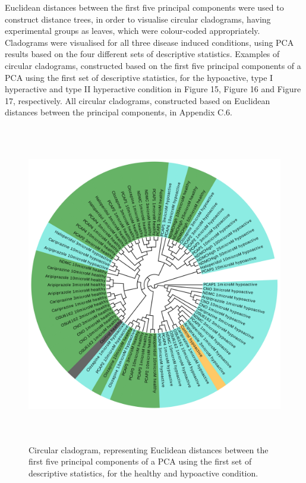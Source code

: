 \documentclass[a4paper,12pt]{article}
\begin{document}
\newpage
Euclidean distances between the first five principal components were used to construct distance trees, in order to visualise circular cladograms, having experimental groups as leaves, which were colour-coded appropriately. Cladograms were visualised for all three disease induced conditions, using PCA results based on the four different sets of descriptive statistics. Examples of circular cladograms, constructed based on the first five principal components of a PCA using the first set of descriptive statistics, for the hypoactive, type I hyperactive and type II hyperactive condition in Figure 15, Figure 16 and Figure 17, respectively. All circular cladograms, constructed based on Euclidean distances between the principal components, in Appendix C.6. 
\begin{figure}[h!]
\begin{center}
\includegraphics[width=14cm,height=14cm]{DarkApoLow_set1_PCA_tree_A.png}
\caption{Circular cladogram, representing Euclidean distances between the first five principal components of a PCA using the first set of descriptive statistics, for the healthy and hypoactive condition.}
\end{center}
\end{figure}
\newpage
\end{document}
